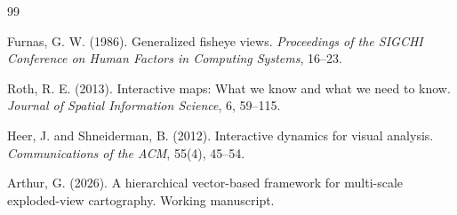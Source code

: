 \documentclass[12pt, a4paper]{article}
\numberwithin{equation}{section}
\begin{document}

\begin{thebibliography}{99}

Furnas, G. W. (1986).
Generalized fisheye views.
\textit{Proceedings of the SIGCHI Conference on Human Factors in Computing Systems}, 16--23.

Roth, R. E. (2013).
Interactive maps: What we know and what we need to know.
\textit{Journal of Spatial Information Science}, 6, 59--115.

Heer, J. and Shneiderman, B. (2012).
Interactive dynamics for visual analysis.
\textit{Communications of the ACM}, 55(4), 45--54.

Arthur, G. (2026).
A hierarchical vector-based framework for multi-scale exploded-view cartography.
Working manuscript.

\end{thebibliography}
\end{document}
